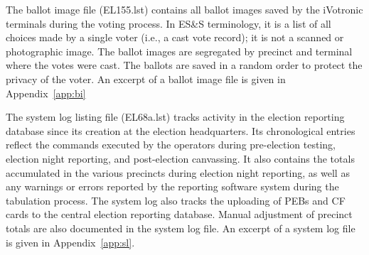 The ballot image file (EL155.lst) contains all ballot images saved by the iVotronic terminals during the voting process. In ES\&S terminology, it is a list of all choices made by a single voter (i.e., a cast vote record); it is not a scanned or photographic image. The ballot images are segregated by precinct and terminal where the votes were cast. The ballots are saved in a random order to protect the privacy of the voter.  An excerpt of a ballot image file is given in  Appendix~\ref{app:bi}
 
The system log listing file (EL68a.lst) tracks activity in the election reporting database since its creation at the election headquarters. Its chronological entries reflect the commands executed by the operators during  pre-election testing, election night reporting, and post-election canvassing. It also contains the totals accumulated in the various precincts during election night reporting, as well as any warnings or errors reported by the reporting software system during the tabulation process. The system log also tracks the uploading of PEBs and CF cards to the central election reporting database. Manual adjustment of precinct totals are also documented in the system log file. An excerpt of a system log file is given in Appendix~\ref{app:sl}.
